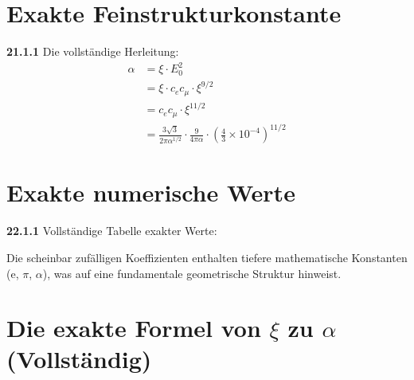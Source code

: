 \section{Exakte Feinstrukturkonstante}
\noindent \textbf{21.1.1} Die vollständige Herleitung:
\begin{align}
	\alpha &= \xi \cdot E_0^2 \\
	&= \xi \cdot c_e c_\mu \cdot \xi^{9/2} \\
	&= c_e c_\mu \cdot \xi^{11/2} \\
	&= \frac{3\sqrt{3}}{2\pi\alpha^{1/2}} \cdot \frac{9}{4\pi\alpha} \cdot \left(\frac{4}{3} \times 10^{-4}\right)^{11/2}
\end{align}

\section{Exakte numerische Werte}

\noindent \textbf{22.1.1} Vollständige Tabelle exakter Werte:

\begin{table}[h]
	\centering
\end{table}

Die scheinbar zufälligen Koeffizienten enthalten tiefere mathematische Konstanten (e, $\pi$, $\alpha$), was auf eine fundamentale geometrische Struktur hinweist.

\section{Die exakte Formel von $\xi$ zu $\alpha$ (Vollständig)}

